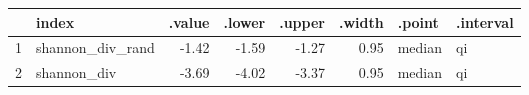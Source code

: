 \begin{table}[ht]
\centering
\begin{tabular}{rlrrrrll}
  \hline
 & index & .value & .lower & .upper & .width & .point & .interval \\ 
  \hline
1 & shannon\_div\_rand & -1.42 & -1.59 & -1.27 & 0.95 & median & qi \\ 
  2 & shannon\_div & -3.69 & -4.02 & -3.37 & 0.95 & median & qi \\ 
   \hline
\end{tabular}
\end{table}

